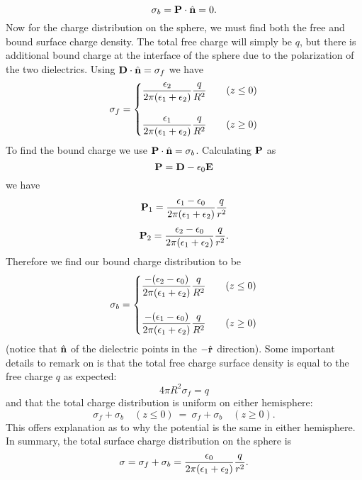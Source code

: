 \documentclass[11pt,letterpaper]{article}
\begin{document}
	\[
		\sigma_b = \mathbf{P}\cdot \hat{\mathbf{n}} = 0 .
	\]
	Now for the charge distribution on the sphere, we must find both the free and bound surface charge density. The total free 
	charge will simply be $q$, but there is additional bound charge at the interface of the sphere due to the polarization of the two 	
	dielectrics. Using $\mathbf{D}\cdot \hat{\mathbf{n}} = \sigma_f$ we have
	\[
		\sigma_f = \begin{cases} \displaystyle \frac{\epsilon_2 }{2\pi(\epsilon_1+\epsilon_2)}\frac{q}{R^2}&\quad(z\le 0) \\ \\
		\displaystyle \frac{\epsilon_1 }{2\pi(\epsilon_1+\epsilon_2)}\frac{q}{R^2}&\quad(z\ge 0)
		\end{cases}
	\]
	To find the bound charge we use $\mathbf{P}\cdot \hat{\mathbf{n}} = \sigma_b$. Calculating $\mathbf{P}$ as
	\[
		\mathbf{P} = \mathbf{D} -\epsilon_0\mathbf{E}
	\]
	we have
	\[
		\mathbf{P}_1 = \frac{\epsilon_1-\epsilon_0}{2\pi(\epsilon_1+\epsilon_2)}\frac{q}{r^2}
	\]
	\[
		\mathbf{P}_2 = \frac{\epsilon_2-\epsilon_0}{2\pi(\epsilon_1+\epsilon_2)}\frac{q}{r^2}.
	\]
	Therefore we find our bound charge distribution to be
	\[
		\sigma_b = \begin{cases} \displaystyle \frac{-(\epsilon_2-\epsilon_0) }{2\pi(\epsilon_1+\epsilon_2)}\frac{q}{R^2}&\quad(z\le 0) \\ \\
		\displaystyle \frac{-(\epsilon_1-\epsilon_0)}{2\pi(\epsilon_1+\epsilon_2)}\frac{q}{R^2}&\quad(z\ge 0)
		\end{cases}
	\]
	(notice that $\hat{\mathbf{n}}$ of the dielectric points in the $-\hat{\mathbf{r}}$ direction). Some important details to remark on is that 
	the total free charge surface density is equal to the free charge $q$ as expected:
	\[
			4\pi R^2 \sigma_f = q
	\]
	and that the total charge distribution is uniform on either hemisphere:
	\[
		\sigma_f+\sigma_b\quad (z\le 0)\  =\  \sigma_f+\sigma_b\quad(z\ge 0).
	\]
	This offers explanation as to why the potential is the same in either hemisphere. In summary, the total surface charge distribution
	on the sphere is
	\[
		\sigma = \sigma_f+\sigma_b =  \frac{\epsilon_0}{2\pi(\epsilon_1+\epsilon_2)}\frac{q}{r^2}.
	\]
\end{document}
